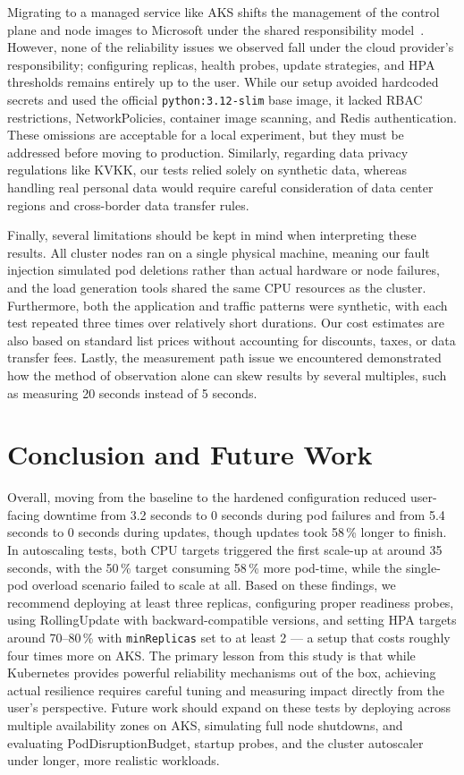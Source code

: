 \documentclass[conference,a4paper]{IEEEtran}
\begin{document}
Migrating to a managed service like AKS shifts the management of the control plane and node images to Microsoft under the shared responsibility model~\cite{azshared}. However, none of the reliability issues we observed fall under the cloud provider's responsibility; configuring replicas, health probes, update strategies, and HPA thresholds remains entirely up to the user. While our setup avoided hardcoded secrets and used the official \texttt{python:3.12-slim} base image, it lacked RBAC restrictions, NetworkPolicies, container image scanning, and Redis authentication. These omissions are acceptable for a local experiment, but they must be addressed before moving to production. Similarly, regarding data privacy regulations like KVKK, our tests relied solely on synthetic data, whereas handling real personal data would require careful consideration of data center regions and cross-border data transfer rules.

Finally, several limitations should be kept in mind when interpreting these results. All cluster nodes ran on a single physical machine, meaning our fault injection simulated pod deletions rather than actual hardware or node failures, and the load generation tools shared the same CPU resources as the cluster. Furthermore, both the application and traffic patterns were synthetic, with each test repeated three times over relatively short durations. Our cost estimates are also based on standard list prices without accounting for discounts, taxes, or data transfer fees. Lastly, the measurement path issue we encountered demonstrated how the method of observation alone can skew results by several multiples, such as measuring 20 seconds instead of 5 seconds.

\section{Conclusion and Future Work}
\label{sec:conclusion}
Overall, moving from the baseline to the hardened configuration reduced user-facing downtime from 3.2 seconds to 0 seconds during pod failures and from 5.4 seconds to 0 seconds during updates, though updates took 58\,\% longer to finish. In autoscaling tests, both CPU targets triggered the first scale-up at around 35 seconds, with the 50\,\% target consuming 58\,\% more pod-time, while the single-pod overload scenario failed to scale at all. Based on these findings, we recommend deploying at least three replicas, configuring proper readiness probes, using RollingUpdate with backward-compatible versions, and setting HPA targets around 70--80\,\% with \texttt{minReplicas} set to at least 2 --- a setup that costs roughly four times more on AKS. The primary lesson from this study is that while Kubernetes provides powerful reliability mechanisms out of the box, achieving actual resilience requires careful tuning and measuring impact directly from the user's perspective. Future work should expand on these tests by deploying across multiple availability zones on AKS, simulating full node shutdowns, and evaluating PodDisruptionBudget, startup probes, and the cluster autoscaler under longer, more realistic workloads.
\end{document}

